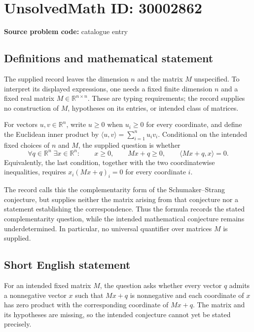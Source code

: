 \documentclass[11pt]{article}
\newcommand{\R}{\mathbb{R}}
\begin{document}
\section*{UnsolvedMath ID: 30002862}
\textbf{Source problem code:} catalogue entry
\subsection{Definitions and mathematical statement}
The supplied record leaves the dimension \(n\) and the matrix \(M\) unspecified. To interpret its displayed expressions, one needs a fixed finite dimension \(n\) and a fixed real matrix \(M\in\R^{n\times n}\). These are typing requirements; the record supplies no construction of \(M\), hypotheses on its entries, or intended class of matrices.

For vectors \(u,v\in\R^n\), write \(u\geq0\) when \(u_i\geq0\) for every coordinate, and define the Euclidean inner product by \(\langle u,v\rangle=\sum_{i=1}^n u_iv_i\). Conditional on the intended fixed choices of \(n\) and \(M\), the supplied question is whether
\[
\forall q\in\R^n\;\exists x\in\R^n:\qquad
x\geq0,\qquad Mx+q\geq0,\qquad
\langle Mx+q,x\rangle=0.
\]
Equivalently, the last condition, together with the two coordinatewise inequalities, requires \(x_i(Mx+q)_i=0\) for every coordinate \(i\).

The record calls this the complementarity form of the Schumaker--Strang conjecture, but supplies neither the matrix arising from that conjecture nor a statement establishing the correspondence. Thus the formula records the stated complementarity question, while the intended mathematical conjecture remains underdetermined. In particular, no universal quantifier over matrices \(M\) is supplied.
\subsection{Short English statement}
For an intended fixed matrix \(M\), the question asks whether every vector \(q\) admits a nonnegative vector \(x\) such that \(Mx+q\) is nonnegative and each coordinate of \(x\) has zero product with the corresponding coordinate of \(Mx+q\). The matrix and its hypotheses are missing, so the intended conjecture cannot yet be stated precisely.
\end{document}
